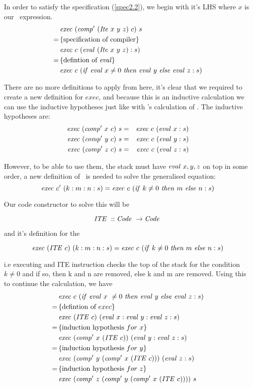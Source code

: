 \documentclass {article}
\begin{document}
In order to satisfy the specification (\ref{spec2.2}),
we begin with it's LHS where $x$ is our
\ite\ expression.
\begin{align*}
	&\Exec (\Compp  (\Ite x\ y\ z)\ c)\ s \\
	=\, & \{ \mbox{specification of compiler} \} \\
	&\Exec c\ (\evalf  (\Ite x\ y\ z) : s) \\
	=\, & \{\mbox{defintion of \eval}\} \\
	&\Exec c\ (\ifff \evalf x \not= 0\ 
		\tthen \evalf y\ \eelse  \evalf z : s)
\end{align*}

There are no more definitions to apply from here,
it's clear that we required to
create a new definition for $exec$,
and because this is an inductive calculation
we can use the inductive hypotheses
just like with \BH's calculation of \add.
The inductive hypotheses are:
\begin{eqnarray*}
	\mathit{exec\ } (\mathit{comp'\ }  x\ c)\ s &=& \mathit{exec\ } c\ (\mathit{eval\ } x:s) \\
	\mathit{exec\ } (\mathit{comp'\ }  y\ c)\ s &=& \mathit{exec\ } c\ (\mathit{eval\ } y:s) \\
	\mathit{exec\ } (\mathit{comp'\ }  z\ c)\ s &=& \mathit{exec\ } c\ (\mathit{eval\ } z:s)
\end{eqnarray*}

However, to be able to use them,
the stack must have 
$\mathit{eval\ } x,y,z$ on top in some order,
a new definition of \exec\ is needed to 
solve the generalised equation:
\[ \mathit{exec\ } c'\ (k:m:n:s) 
	= \mathit{exec\ } c\ (\mathit{if\ } k \not= 0\ \mathit{then\ } m\ \mathit{else\ }  n : s)\]

Our code constructor to solve this will be

\newcommand{\ITEt}{\textit{ITE\ }}
\newcommand{\ITE}{\mathit{ITE\ }}

	\[ \ITE :: \Code \rightarrow \Code \]

and it's definition for the \vm

	\[ \Exec (\ITE c)\ (k:m:n:s) 
		= \Exec c\ (\ifff k \not= 0\ \tthen m\ \eelse n:s) \]

i.e executing and ITE instruction
checks the top of the stack for the condition $k \not= 0$
and if so, then k and n are removed,
else k and m are removed.
Using this to continue the calculation, we have
\begin{align*}
	&\Exec c\ (\ifff \evalf  x\ \not= 0\ \tthen \evalf  y\ \eelse \evalf  z :s) \\
	=\, & \{\mbox{defintion of}\ exec\} \\
	&\Exec (\ITE c)\ (\evalf  x:\evalf  y:\evalf  z:s) \\
	=\, & \{\mbox{induction hypothesis}\ for\ x\} \\
	&\Exec (\Compp  x\ (\ITE c))\ (\evalf  y:\evalf  z:s) \\
	=\, & \{\mbox{induction hypothesis}\ for\ y\} \\
	&\Exec (\Compp  y\ (\Compp  x\ (\ITE c)))\ (\evalf  z:s) \\
	=\, & \{\mbox{induction hypothesis}\ for\ z\} \\
	&\Exec (\Compp  z\ (\Compp  y\ (\Compp  x\ (\ITE c))))\ s
\end{align*}
\end{document}
